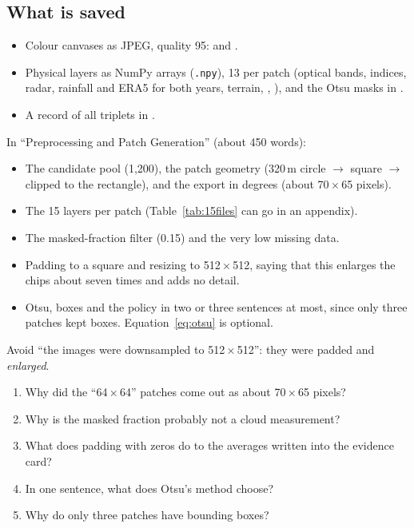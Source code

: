\subsection{What is saved}

\begin{itemize}
  \item Colour canvases as JPEG, quality 95:  and .
  \item Physical layers as NumPy arrays (\texttt{.npy}), 13 per patch (optical bands, indices, radar, rainfall and ERA5 for both years, terrain, \dndvi, \dnbr), and the Otsu masks in .
  \item A record of all triplets in .
\end{itemize}

\begin{foryourreport}
In ``Preprocessing and Patch Generation'' (about 450 words):
\begin{itemize}
  \item The candidate pool (1,200), the patch geometry (320\,m circle $\rightarrow$ square $\rightarrow$ clipped to the rectangle), and the export in degrees (about 70\,$\times$\,65 pixels).
  \item The 15 layers per patch (Table~\ref{tab:15files} can go in an appendix).
  \item The masked-fraction filter (0.15) and the very low missing data.
  \item Padding to a square and resizing to 512\,$\times$\,512, saying that this enlarges the chips about seven times and adds no detail.
  \item Otsu, boxes and the policy in two or three sentences at most, since only three patches kept boxes. Equation~\ref{eq:otsu} is optional.
\end{itemize}
Avoid ``the images were downsampled to 512\,$\times$\,512'': they were padded and \emph{enlarged}.
\end{foryourreport}

\begin{selfcheck}
\begin{enumerate}
  \item Why did the ``64\,$\times$\,64'' patches come out as about 70\,$\times$\,65 pixels?
  \item Why is the masked fraction probably not a cloud measurement?
  \item What does padding with zeros do to the averages written into the evidence card?
  \item In one sentence, what does Otsu's method choose?
  \item Why do only three patches have bounding boxes?
\end{enumerate}
\end{selfcheck}
